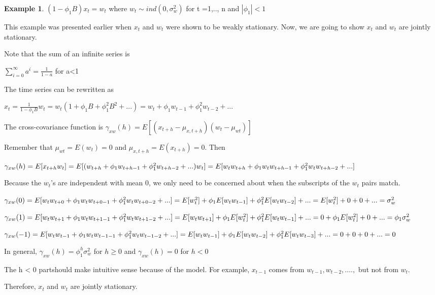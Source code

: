 \documentclass[
]{book}
\theoremstyle{definition}
\theoremstyle{definition}
\newtheorem{example}{Example}[chapter]
\theoremstyle{definition}
\theoremstyle{definition}
\theoremstyle{remark}
\begin{document}
\begin{example}
\((1-\phi_1B)x_t=w_t\) where \(w_t\sim ind(0,\sigma_w^2)\) for t =1,.., n and \(|\phi_1|<1\)

This example was presented earlier when \(x_t\) and \(w_t\) were shown to be weakly stationary. Now, we are going to show \(x_t\) and \(w_t\) are jointly stationary.

Note that the sum of an infinite series is

\(\sum_{i=0}^{\infty}a^i=\frac{1}{1-a}\) for \textbar a\textbar\textless1

The time series can be rewritten as

\(x_t=\frac{1}{1-\phi_1B}w_t=w_t(1+\phi_1B+\phi_1^2B^2+...)=w_t+\phi_1w_{t-1}+\phi_1^2w_{t-2}+...\)

The cross-covariance function is \(\gamma_{xw}(h)=E[(x_{t+h}-\mu_{x,t+h})(w_t-\mu_{wt})]\)

Remember that \(\mu_{wt} = E(w_t) = 0\) and \(\mu_{x,t+h} =E(x_{t+h}) = 0\). Then

\(\gamma_{xw}(h) = E[x_{t+h}w_t]\\= E[(w_{t+h}+\phi_1w_{t+h-1}+\phi_1^2w_{t+h-2}+...)w_t]\\=E[w_tw_{t+h}+\phi_1w_tw_{t+h-1}+\phi_1^2w_tw_{t+h-2}+...]\)

Because the \(w_t\)'s are independent with mean 0, we only need to be concerned about when the subscripts of the \(w_t\) pairs match.

\(\gamma_{xw}(0)=E[w_tw_{t+0}+\phi_1w_tw_{t+0-1}+\phi_1^2w_tw_{t+0-2}+...]\\=E[w_t^2]+\phi_1E[w_tw_{t-1}]+\phi_1^2E[w_tw_{t-2}]+...\\=E[w_t^2]+0+0+...\\=\sigma_w^2\)

\(\gamma_{xw}(1)=E[w_tw_{t+1}+\phi_1w_tw_{t+1-1}+\phi_1^2w_tw_{t+1-2}+...]\\=E[w_tw_{t+1}]+\phi_1E[w_t^2]+\phi_1^2E[w_tw_{t-1}]+...\\=0+\phi_1E[w_t^2]+0+...\\=\phi_1\sigma_w^2\)

\(\gamma_{xw}(-1)=E[w_tw_{t-1}+\phi_1w_tw_{t-1-1}+\phi_1^2w_tw_{t-1-2}+...]\\=E[w_tw_{t-1}]+\phi_1E[w_tw_{t-2}]+\phi_1^2E[w_tw_{t-3}]+...\\=0+0+0+...\\=0\)

In general, \(\gamma_{xw}(h)=\phi_1^h\sigma_w^2\) for \(h\ge 0\) and \(\gamma_{xw}(h)=0\) for \(h< 0\)

The h \textless{} 0 partshould make intuitive sense because of the model. For example, \(x_{t-1}\) comes from \(w_{t-1}, w_{t-2}, ….,\) but not from \(w_t\).

Therefore, \(x_t\) and \(w_t\) are jointly stationary.
\end{example}
\end{document}
